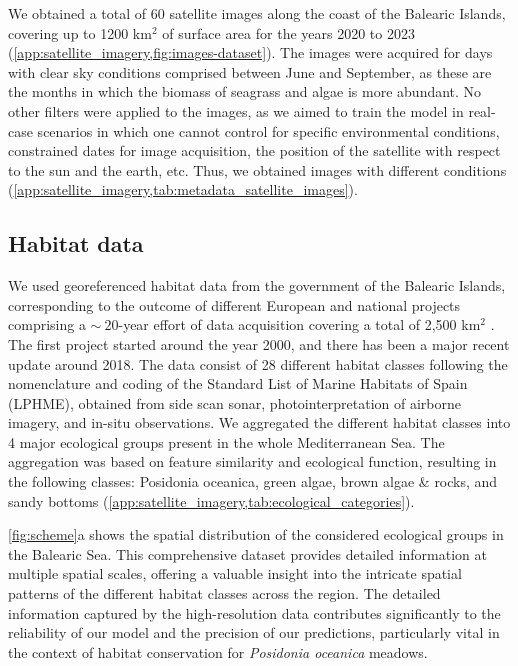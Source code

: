 We obtained a total of 60 satellite images along the coast of the Balearic
Islands, covering up to 1200 km$^2$ of surface area for the years 2020 to 2023
(\cref{app:satellite_imagery,fig:images-dataset}). The images were
acquired for days with clear sky conditions comprised between June and
September, as these are the months in which the biomass of seagrass and algae
is more abundant. No other filters were applied to the images, as we aimed to
train the model in real-case scenarios in which one cannot control for specific
environmental conditions, constrained dates for image acquisition, the position
of the satellite with respect to the sun and the earth, etc. Thus, we obtained
images with different conditions
(\cref{app:satellite_imagery,tab:metadata_satellite_images}).

\subsection{Habitat data}

We used georeferenced habitat data from the government of the Balearic
Islands, corresponding to the outcome of different European and national
projects comprising a $\sim~20$-year effort of data acquisition covering a
total of 2,500 km$^2$ \cite{cartografia,ValleVillalonga2023}. The first
project started around the year 2000, and there has been a major recent update
around 2018. The data consist of 28 different habitat classes following the
nomenclature and coding of the Standard List of Marine Habitats of Spain
(LPHME), obtained from side scan sonar, photointerpretation of airborne
imagery, and in-situ observations. We aggregated the different habitat classes
into 4 major ecological groups present in the whole Mediterranean Sea. The
aggregation was based on feature similarity and ecological function, resulting
in the following classes: Posidonia oceanica, green algae, brown algae \&
rocks, and sandy bottoms
(\cref{app:satellite_imagery,tab:ecological_categories}).

\cref{fig:scheme}a shows the spatial distribution of the considered ecological
groups in the Balearic Sea. This comprehensive dataset provides detailed
information at multiple spatial scales, offering a valuable insight into the
intricate spatial patterns of the different habitat classes across the region.
The detailed information captured by the high-resolution data contributes
significantly to the reliability of our model and the precision of our
predictions, particularly vital in the context of habitat
conservation for \textit{Posidonia oceanica} meadows.

